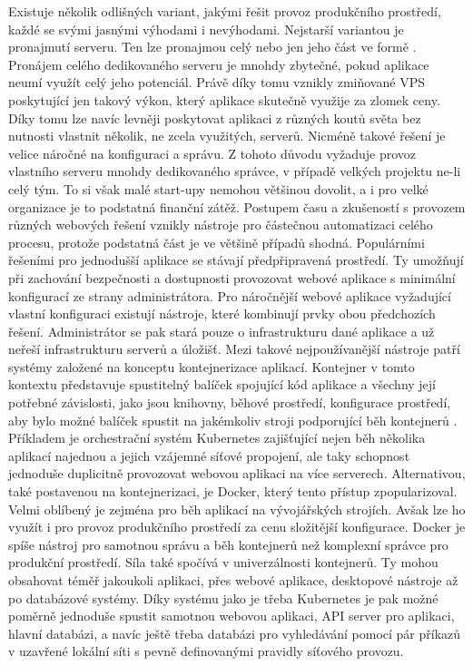 		Existuje několik odlišných variant, jakými řešit provoz produkčního prostředí, každé se svými jasnými výhodami i nevýhodami.
		Nejstarší variantou je pronajmutí serveru.
		Ten lze pronajmou celý nebo jen jeho část ve formě .
		Pronájem celého dedikovaného serveru je mnohdy zbytečné, pokud aplikace neumí využít celý jeho potenciál.
		Právě díky tomu vznikly zmiňované \Ac{VPS} poskytující jen takový výkon, který aplikace skutečně využije za
		zlomek ceny.
		Díky tomu lze navíc levněji poskytovat aplikaci z různých koutů světa bez nutnosti vlastnit několik, ne zcela
		využitých, serverů.
		Nicméně takové řešení je velice náročné na konfiguraci a správu.
		Z tohoto důvodu vyžaduje provoz vlastního serveru mnohdy dedikovaného správce, v případě velkých projektu ne-li celý tým.
		To si však malé start-upy nemohou většinou dovolit, a i pro velké organizace je to podstatná finanční zátěž.
		Postupem času a zkušeností s provozem různých webových řešení vznikly nástroje pro částečnou automatizaci
		celého procesu, protože podstatná část je ve většině případů shodná.
		Populárními řešeními pro jednodušší aplikace se stávají předpřipravená prostředí.
		Ty umožňují při zachování bezpečnosti a dostupnosti provozovat webové aplikace s minimální konfigurací ze strany
		administrátora.
		Pro náročnější webové aplikace vyžadující vlastní konfiguraci existují nástroje, které kombinují prvky
		obou předchozích řešení.
		Administrátor se pak stará pouze o infrastrukturu dané aplikace a už neřeší infrastrukturu serverů a úložišť.
		Mezi takové nejpoužívanější nástroje patří systémy založené na konceptu kontejnerizace aplikací.
		Kontejner v tomto kontextu představuje spustitelný balíček spojující kód aplikace a všechny její potřebné závislosti, jako jsou
		knihovny, běhové prostředí, konfigurace prostředí, aby bylo možné balíček spustit na jakémkoliv stroji podporující
		běh kontejnerů \cite{what_is_container}.
		Příkladem je orchestrační systém Kubernetes zajišťující nejen běh několika aplikací najednou a jejich vzájemné síťové propojení,
		ale taky schopnost jednoduše duplicitně provozovat webovou aplikaci na více serverech.
		Alternativou, také postavenou na kontejnerizaci, je Docker, který tento přístup zpopularizoval.
		Velmi oblíbený je zejména pro běh aplikací na vývojářských strojích.
		Avšak lze ho využít i pro provoz produkčního prostředí za cenu složitější konfigurace.
		Docker je spíše nástroj pro samotnou správu a běh kontejnerů než komplexní správce pro produkční prostředí.
		Síla také spočívá v univerzálnosti kontejnerů.
		Ty mohou obsahovat téměř jakoukoli aplikaci, přes webové aplikace, desktopové nástroje až po databázové systémy.
		Díky systému jako je třeba Kubernetes je pak možné poměrně jednoduše spustit samotnou webovou aplikaci, API server pro
		aplikaci, hlavní databázi, a navíc ještě třeba databázi pro vyhledávání pomocí pár příkazů v uzavřené lokální síti
		s pevně definovanými pravidly síťového provozu.


